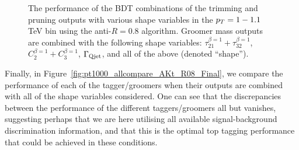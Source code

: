 \begin{figure}
\centering
{}
\caption{The performance of the BDT combinations of the trimming and pruning outputs with various shape variables in the $p_T = 1-1.1$ TeV bin using the anti-\kT $R=0.8$ algorithm. Groomer mass outputs are combined with the following shape variables: $\tau_{21}^{\beta=1}+\tau_{32}^{\beta=1}$, $C_{2}^{\beta=1}+C_{3}^{\beta=1}$, $\Gamma_{\rm Qjet}$, and all of the above (denoted ``shape'').}
\label{fig:pt1000_allcompare_AKt_R08_GroomSh}
\end{figure}

Finally, in Figure~\ref{fig:pt1000_allcompare_AKt_R08_Final}, we compare the performance of each of the tagger/groomers when their outputs are combined with all of the shape variables considered. One can see that the discrepancies between the performance of the different taggers/groomers all but vanishes, suggesting perhaps that we are here utilising all available signal-background discrimination information, and that this is the optimal top tagging performance that could be achieved in these conditions. 

